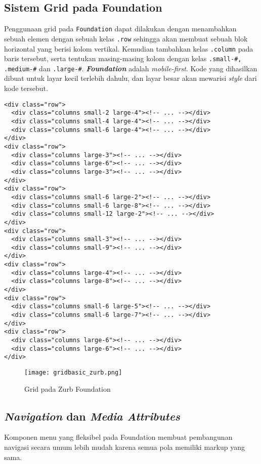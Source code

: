 \subsection{Sistem Grid pada Foundation}
\label{subs:grid_zurb}
Penggunaan grid pada \texttt{Foundation} dapat dilakukan dengan menambahkan sebuah elemen dengan sebuah kelas \texttt{.row} sehingga akan membuat sebuah blok horizontal yang berisi kolom vertikal. Kemudian tambahkan kelas \texttt{.column} pada baris tersebut, serta tentukan masing-masing kolom dengan kelas \texttt{.small-#, .medium-#} dan \texttt{.large-#}. 
\textbf{\textit{Foundation}} adalah \textit{mobile-first}. Kode yang dihasilkan dibuat untuk layar kecil terlebih dahulu, dan layar besar akan mewarisi \textit{style} dari kode tersebut. \cite{zurbfoundation:17}
\begin{lstlisting}[frame=single] 
<div class="row">
  <div class="columns small-2 large-4"><!-- ... --></div>
  <div class="columns small-4 large-4"><!-- ... --></div>
  <div class="columns small-6 large-4"><!-- ... --></div>
</div>
<div class="row">
  <div class="columns large-3"><!-- ... --></div>
  <div class="columns large-6"><!-- ... --></div>
  <div class="columns large-3"><!-- ... --></div>
</div>
<div class="row">
  <div class="columns small-6 large-2"><!-- ... --></div>
  <div class="columns small-6 large-8"><!-- ... --></div>
  <div class="columns small-12 large-2"><!-- ... --></div>
</div>
<div class="row">
  <div class="columns small-3"><!-- ... --></div>
  <div class="columns small-9"><!-- ... --></div>
</div>
<div class="row">
  <div class="columns large-4"><!-- ... --></div>
  <div class="columns large-8"><!-- ... --></div>
</div>
<div class="row">
  <div class="columns small-6 large-5"><!-- ... --></div>
  <div class="columns small-6 large-7"><!-- ... --></div>
</div>
<div class="row">
  <div class="columns large-6"><!-- ... --></div>
  <div class="columns large-6"><!-- ... --></div>
</div>
\end{lstlisting}

\begin{figure} [H]
	\centering  
	\texttt{[image: gridbasic\_zurb.png]}  
	\caption{Grid pada Zurb Foundation}
	\label{fig:gridbasic_zurb} 
\end{figure}

\subsection{\textit{Navigation} dan \textit{Media Attributes}}
\label{subs:view}
Komponen menu yang fleksibel pada Foundation membuat pembangunan navigasi secara umum lebih mudah karena semua pola memiliki markup yang sama.

